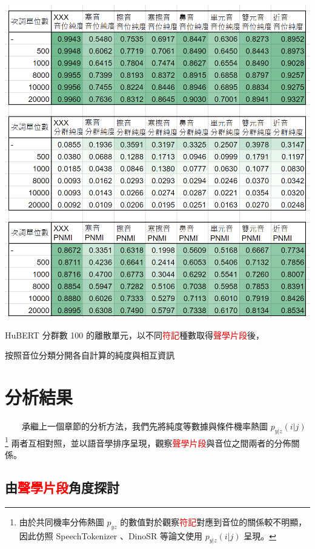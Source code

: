 {        \begin{table}
            \centering
            \includegraphics[width=1\linewidth]{figures/ch4figs/hub100-ap-detailedpur.png}
            \caption{HuBERT 分群數 100 的離散單元，以不同\textcolor{red}{符記}種數取得\textcolor{red}{聲學片段}後，}
            按照音位分類分開各自計算的純度與相互資訊
            \label{tabfig:hub100-ap-detailedpur}
        \end{table}
    }


\section{分析結果} 

　　承繼上一個章節的分析方法，我們先將純度等數據與條件機率熱圖 $p_{y|z}(i | j)$ \footnote{由於共同機率分佈熱圖 $p_{yz}$ 的數值對於觀察\textcolor{red}{符記}對應到音位的關係較不明顯，因此仿照 SpeechTokenizer \cite{zhang2024speechtokenizer}、DinoSR \cite{liu2024dinosr} 等論文使用 $p_{y|z}(i | j)$ 呈現。} 兩者互相對照，並以語音學排序呈現，觀察\textcolor{red}{聲學片段}與音位之間兩者的分佈關係。

\subsection{由\textcolor{red}{聲學片段}角度探討}

